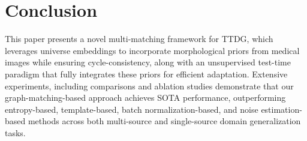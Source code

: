 \section{Conclusion}
This paper presents a novel multi-matching framework for TTDG, which leverages universe embeddings to incorporate morphological priors from medical images while ensuring cycle-consistency, along with an unsupervised test-time paradigm that fully integrates these priors for efficient adaptation.
Extensive experiments, including comparisons and ablation studies demonstrate that our graph-matching-based approach achieves SOTA performance, outperforming entropy-based, template-based, batch normalization-based, and noise estimation-based methods across both multi-source and single-source domain generalization tasks. 

